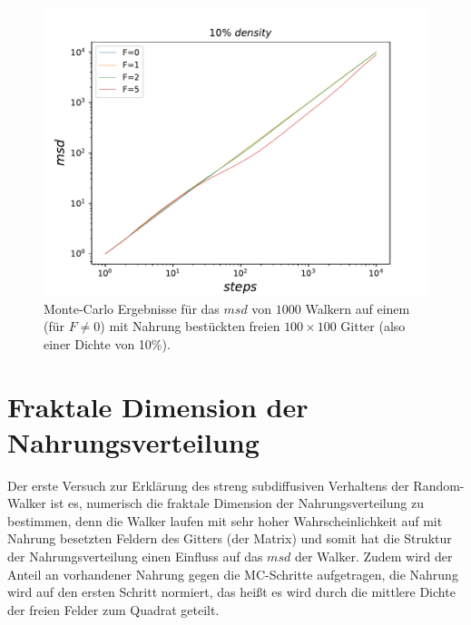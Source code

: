 \documentclass[a4paper, 12pt]{report}
\begin{document}
\begin{figure}[h!]
	\centering
	\includegraphics[scale=0.9]{mult_food.pdf}
	\caption{\label{vieleF}Monte-Carlo Ergebnisse für das $msd$ von $1000$ Walkern auf einem (für $F\neq0$) mit Nahrung bestückten freien $100\times 100$ Gitter (also einer Dichte von 10\%).}
\end{figure}

\newpage

\section{Fraktale Dimension der Nahrungsverteilung}
Der erste Versuch zur Erklärung des streng subdiffusiven Verhaltens der Random-Walker ist es, numerisch die fraktale Dimension der Nahrungsverteilung zu bestimmen, denn die Walker laufen mit sehr hoher Wahrscheinlichkeit auf mit Nahrung besetzten Feldern des Gitters (der Matrix) und somit hat die Struktur der Nahrungsverteilung einen Einfluss auf das $msd$ der Walker. Zudem wird der Anteil an vorhandener Nahrung gegen die MC-Schritte aufgetragen, die Nahrung wird auf den ersten Schritt normiert, das heißt es wird durch die mittlere Dichte der freien Felder zum Quadrat geteilt.
\end{document}
